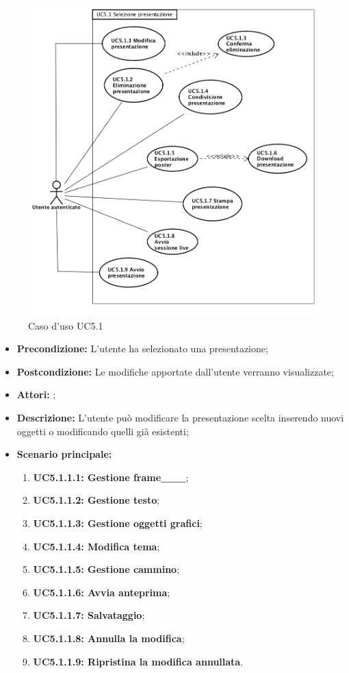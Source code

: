 \begin{figure}[h]
	\begin{center}
	\includegraphics[scale=0.4]{diagram/UC5-1.png}
	\caption{Caso d'uso UC5.1}
	\end{center}
\end{figure}
\begin{itemize}
	\item \textbf{Precondizione:} L'utente ha selezionato una presentazione;
	\item \textbf{Postcondizione:} Le modifiche apportate dall'utente verranno visualizzate;
	\item \textbf{Attori:} ;
	\item \textbf{Descrizione:} L'utente può modificare la presentazione scelta inserendo nuovi oggetti o modificando quelli già esistenti;
	\item \textbf{Scenario principale:}
	\begin{enumerate}
		\item \textbf{ UC5.1.1.1: Gestione frame___};
		\item \textbf{ UC5.1.1.2: Gestione testo};
		\item \textbf{ UC5.1.1.3: Gestione oggetti grafici};
		\item \textbf{ UC5.1.1.4: Modifica tema};
		\item \textbf{ UC5.1.1.5: Gestione cammino};
		\item \textbf{ UC5.1.1.6: Avvia anteprima};
		\item \textbf{ UC5.1.1.7: Salvataggio};
		\item \textbf{ UC5.1.1.8: Annulla la modifica};
		\item \textbf{ UC5.1.1.9: Ripristina la modifica annullata}.
	\end{enumerate}
\end{itemize}
